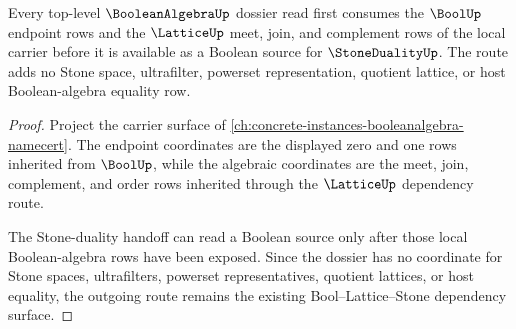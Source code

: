 \begin{theorem}
\label{thm:booleanalgebra-dossier-lattice-route}
Every top-level $\BooleanAlgebraUp$ dossier read first consumes the $\BoolUp$
endpoint rows and the $\LatticeUp$ meet, join, and complement rows of the
local carrier before it is available as a Boolean source for $\StoneDualityUp$.
The route adds no Stone space, ultrafilter, powerset representation, quotient
lattice, or host Boolean-algebra equality row.
\end{theorem}

\begin{proof}
Project the carrier surface of \autoref{ch:concrete-instances-booleanalgebra-namecert}.
The endpoint coordinates are the displayed zero and one rows inherited from
$\BoolUp$, while the algebraic coordinates are the meet, join, complement,
and order rows inherited through the $\LatticeUp$ dependency route.

The Stone-duality handoff can read a Boolean source only after those local
Boolean-algebra rows have been exposed. Since the dossier has no coordinate
for Stone spaces, ultrafilters, powerset representatives, quotient lattices,
or host equality, the outgoing route remains the existing Bool--Lattice--Stone
dependency surface.
\end{proof}
